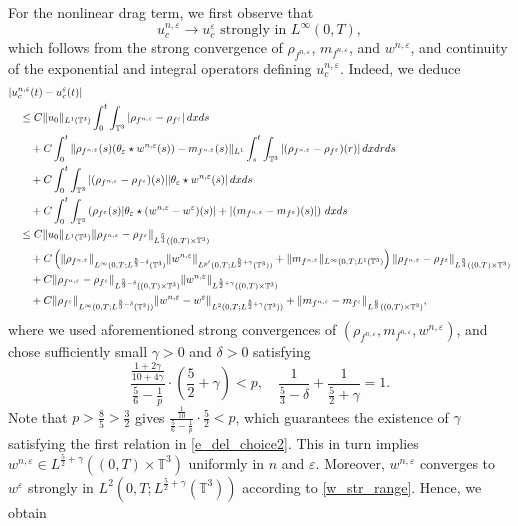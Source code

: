 \documentclass[10pt,reqno]{amsart}
\numberwithin{equation}{section}
\newcommand{\T}{\mathbb T}
\newcommand{\bq}{\begin{equation}}
\newcommand{\eq}{\end{equation}}
\newcommand{\e}{\varepsilon}
\newcommand{\lt}{\left}
\newcommand{\rt}{\right}
\newcommand{\intt}{\int_{\T^3}}
\begin{document}
\medskip

 For the nonlinear drag term, we first observe that 
\begin{equation}\label{ucLinfty}u_c^{n,\e} \to u_c^\e \mbox{ strongly in }L^\infty(0,T),
\end{equation} 
which follows from the strong convergence of $\rho_{f^{n,\e}}$, $m_{f^{n,\e}}$, and $w^{n,\e}$, and continuity of the exponential and integral operators defining $u_c^{n,\e}$. Indeed, we deduce
\begin{align*}
&|u_c^{n,\e}(t) - u_c^\e(t)| \cr
&\quad \le C\|u_0\|_{L^1(\T^3)} \int_0^t \intt |\rho_{f^{n,\e}} - \rho_{f^\e}|\,dxds\\
&\qquad +  C\int_0^t \|\rho_{f^{n,\e}}(s)(\theta_\e \star w^{n,\e}(s)) - m_{f^{n,\e}}(s)\|_{L^1}  \int_s^t \intt |(\rho_{f^{n,\e}} - \rho_{f^\e})(r)|\,dxdrds\\
&\qquad + C\int_0^t \intt|(\rho_{f^{n,\e}} - \rho_{f^\e})(s)| |\theta_\e  \star w^{n,\e}(s)|\,dxds\\
&\qquad + C\int_0^t \intt \lt(\rho_{f^\e} (s) |\theta_\e \star (w^{n,\e} - w^\e)(s)| + |(m_{f^{n,\e}} - m_{f^\e})(s)| \rt)\,dxds\\
&\quad \le C \|u_0\|_{L^1(\T^3)}\|\rho_{f^{n,\e}} - \rho_{f^\e}\|_{L^{\frac 54}((0,T)\times\T^3)}\\
&\qquad + C\lt(\|\rho_{f^{n,\e}}\|_{L^\infty(0,T;L^{\frac 53 -\delta}(\T^3)}\|w^{n,\e}\|_{L^{p'}(0,T;L^{\frac 52 +\gamma}(\T^3))} + \|m_{f^{n,\e}}\|_{L^\infty(0,T;L^1(\T^3)}\rt)\|\rho_{f^{n,\e}} - \rho_{f^\e}\|_{L^{\frac 54}((0,T)\times\T^3)}\\
&\qquad+ C\|\rho_{f^{n,\e}} - \rho_{f^\e}\|_{L^{\frac 53-\delta}((0,T)\times\T^3)} \|w^{n,\e}\|_{L^{\frac 52 +\gamma}((0,T)\times\T^3)}\\
&\qquad + C\|\rho_{f^\e} \|_{L^\infty(0,T;L^{\frac 53-\delta}(\T^3))} \|w^{n,\e} - w^\e\|_{L^2(0,T;L^{\frac 52+\gamma}(\T^3))} + \|m_{f^{n,\e}} - m_{f^\e}\|_{L^{\frac 65}((0,T)\times\T^3)},
\end{align*}
where we used aforementioned strong convergences of $(\rho_{f^{n,\e}}, m_{f^{n,\e}}, w^{n,\e})$, and chose sufficiently small $\gamma>0$ and $\delta>0$ satisfying
\bq\label{e_del_choice2}
\frac{\frac{1 + 2\gamma}{10 + 4\gamma}}{\frac{5}{6} - \frac{1}{p}} \cdot \lt(\frac 52+\gamma\rt) < p,\quad \frac{1}{\frac 53 - \delta} + \frac{1}{\frac 52 +\gamma}=1.
\eq
Note that  $p>\frac85 > \frac32$ gives $\frac{\frac{1}{10}}{\frac56 - \frac1p} \cdot \frac52 <p$, which guarantees the existence of $\gamma$ satisfying the first relation in \eqref{e_del_choice2}. This in turn implies $w^{n,\e} \in L^{\frac52+\gamma}((0,T)\times\T^3)$ uniformly in $n$ and $\e$. Moreover, $w^{n,\e}$ converges to $w^\e$ strongly in $L^2(0,T;L^{\frac 52+\gamma}(\T^3))$ according to \eqref{w_str_range}. Hence, we obtain
\end{document}
